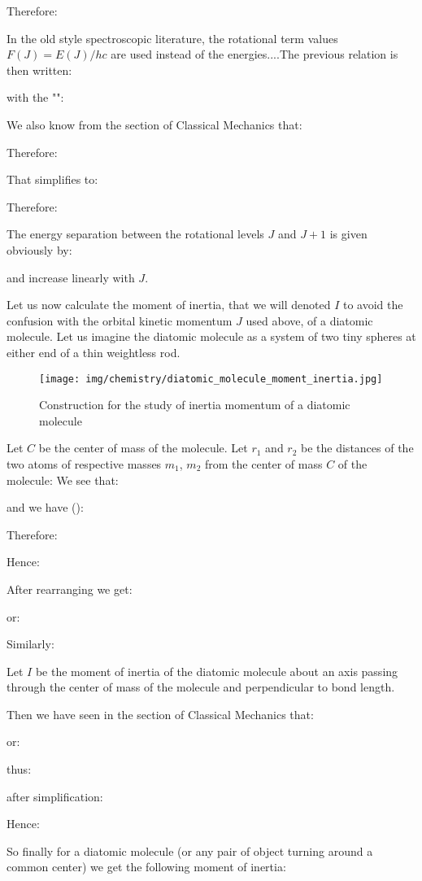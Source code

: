 	Therefore:
	
	In the old style spectroscopic literature, the rotational term values $F(J) = E(J)/hc$ are used instead of the energies....The previous relation is then written:
	
	with the "":
	
	
	We also know from the section of Classical Mechanics that:
	
	Therefore:
	
	That simplifies to:
	
	Therefore:
	
	
	The energy separation between the rotational levels $J$ and $J+1$ is given obviously by:
	
	and increase linearly with $J$.
	
	Let us now calculate the moment of inertia, that we will denoted $I$ to avoid the confusion with the orbital kinetic momentum $J$ used above, of a diatomic molecule. Let us imagine the diatomic molecule as a system of two tiny spheres at either end of a thin weightless rod.
	\begin{figure}[H]
		\centering
		\texttt{[image: img/chemistry/diatomic\_molecule\_moment\_inertia.jpg]}	
		\caption{Construction for the study of inertia momentum of a diatomic molecule}
	\end{figure}
	Let $C$ be the center of mass of the molecule. Let $r_1$ and $r_2$ be the distances of the two atoms of respective masses $m_1$, $m_2$ from the center of mass $C$ of the molecule:
	We see that:
	
	and we have ():
	
	Therefore:
	
	Hence:
	
	After rearranging we get:
	
	or:
	
	Similarly:
	
	Let $I$ be the moment of inertia of the diatomic molecule about an axis passing through the center of mass of the molecule and perpendicular to bond length.

	Then we have seen in the section of Classical Mechanics that:
	
	or:
	
	thus:
	
	after simplification:
	
	Hence:
	
	So finally for a diatomic molecule (or any pair of object turning around a common center) we get the following moment of inertia:
	
